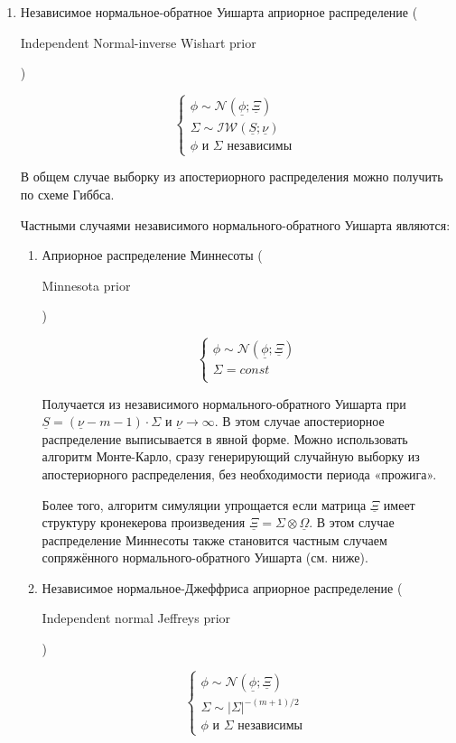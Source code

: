 \documentclass[11pt]{article} %
\newcommand{\cN}{\mathcal{N}}
\newcommand{\cIW}{\mathcal{IW}}
\newcommand{\prior}{\underline}
\newcommand{\eng}[1]{\begin{otherlanguage}{english}#1\end{otherlanguage}}
\begin{document}
\begin{enumerate}

\item Независимое нормальное-обратное Уишарта априорное распределение (\eng{Independent Normal-inverse Wishart prior})


\begin{equation}
\begin{cases}
\phi \sim \cN(\prior\phi; \prior\Xi ) \\
\Sigma \sim \cIW(\prior S; \prior\nu) \\
\phi \text{ и } \Sigma \text{ независимы }
\end{cases}
\end{equation}


В общем случае выборку из  апостериорного распределения можно получить
по схеме Гиббса.


Частными случаями независимого нормального-обратного Уишарта являются:


\begin{enumerate}

\item Априорное распределение Миннесоты (\eng{Minnesota prior})


\begin{equation}
\begin{cases}
\phi \sim \cN(\prior\phi; \prior\Xi ) \\
\Sigma = const \\
\end{cases}
\end{equation}


Получается из независимого нормального-обратного Уишарта при $\prior
S=(\prior \nu-m-1) \cdot \Sigma$ и $\prior \nu \to \infty$. В этом случае
апостериорное распределение выписывается в явной форме. Можно
использовать алгоритм Монте-Карло, сразу генерирующий случайную
выборку из апостериорного распределения, без необходимости периода
«прожига».


Более того, алгоритм симуляции упрощается если матрица $\prior \Xi$
имеет структуру кронекерова произведения $\prior \Xi =  \Sigma \otimes
\prior \Omega $. В этом случае распределение Миннесоты также становится
частным случаем сопряжённого нормального-обратного Уишарта (см. ниже).


\item Независимое нормальное-Джеффриса априорное распределение (\eng{Independent normal Jeffreys prior})


\begin{equation}
\begin{cases}
\phi \sim \cN(\prior\phi; \prior\Xi ) \\
\Sigma \sim |\Sigma|^{-(m+1)/2} \\
\phi \text{ и } \Sigma \text{ независимы }
\end{cases}
\end{equation}





\end{enumerate}
\end{enumerate}
\end{document}
